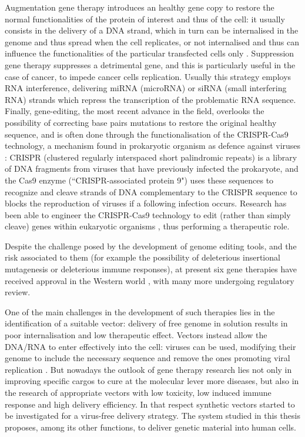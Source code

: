 Augmentation gene therapy introduces an healthy gene copy to restore the normal functionalities of the protein of interest and thus of the cell: it usually consists in the delivery of a DNA strand, which in turn can be internalised in the genome and thus spread when the cell replicates, or not internalised and thus can influence the functionalities of the particular transfected cells only \cite{Anguela2019}.
%
Suppression gene therapy suppresses a detrimental gene, and this is particularly useful in the case of cancer, to impede cancer cells replication. Usually this strategy employs RNA interference, delivering miRNA (microRNA) or siRNA (small interfering RNA) strands which repress the transcription of the problematic RNA sequence.
%
Finally, gene-editing, the most recent advance in the field, overlooks the possibility of correcting base pairs mutations to restore the original healthy sequence, and is often done through the functionalisation of the CRISPR-Cas9 technology, a mechanism found in prokaryotic organism as defence against viruses \cite{Barrangou2015}:
%
CRISPR (clustered regularly interspaced short palindromic repeats) is a library of DNA fragments from viruses that have previously infected the prokaryote, and the Cas9 enzyme (``CRISPR-associated protein 9") uses these sequences to recognize and cleave strands of DNA complementary to the CRISPR sequence to blocks the reproduction of viruses if a following infection occurs. Research has been able to engineer the CRISPR-Cas9 technology to edit (rather than simply cleave) genes within eukaryotic organisms \cite{Zhang2014cas}, thus performing a therapeutic role.

Despite the challenge posed by the development of genome editing tools, and the risk associated to them (for example the possibility of deleterious insertional mutagenesis or deleterious immune responses), at present six gene therapies have received approval in the Western world \cite{Anguela2019}, with many more undergoing regulatory review. 

One of the main challenges in the development of such therapies lies in the identification of a suitable vector: delivery of free genome in solution results in poor internalisation and low therapeutic effect. Vectors instead allow the DNA/RNA to enter effectively into the cell: viruses can be used, modifying their genome to include the necessary sequence and remove the ones promoting viral replication \cite{Naldini2011,Mingozzi2011}.
%
But nowadays the outlook of gene therapy research lies not only in improving specific cargos to cure at the molecular lever more diseases, but also in the research of appropriate vectors with low toxicity, low induced immune response and high delivery efficiency. In that respect synthetic vectors started to be investigated for a virus-free delivery strategy. The system studied in this thesis proposes, among its other functions, to deliver genetic material into human cells.


